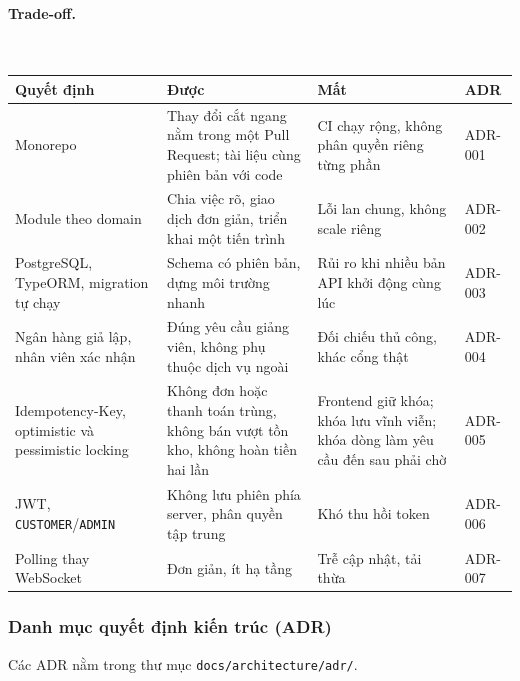 \paragraph{Trade-off.}
\mbox{}\\
{\small\renewcommand{\arraystretch}{1.25}
\begin{tabularx}{\linewidth}{@{}l X X l@{}}
\toprule
\textbf{Quyết định} & \textbf{Được} & \textbf{Mất} & \textbf{ADR} \\
\midrule
Monorepo & Thay đổi cắt ngang nằm trong một Pull Request; tài liệu cùng phiên bản với code & CI chạy rộng, không phân quyền riêng từng phần & ADR-001 \\
Module theo domain & Chia việc rõ, giao dịch đơn giản, triển khai một tiến trình & Lỗi lan chung, không scale riêng & ADR-002 \\
PostgreSQL, TypeORM, migration tự chạy & Schema có phiên bản, dựng môi trường nhanh & Rủi ro khi nhiều bản API khởi động cùng lúc & ADR-003 \\
Ngân hàng giả lập, nhân viên xác nhận & Đúng yêu cầu giảng viên, không phụ thuộc dịch vụ ngoài & Đối chiếu thủ công, khác cổng thật & ADR-004 \\
Idempotency-Key, optimistic và pessimistic locking & Không đơn hoặc thanh toán trùng, không bán vượt tồn kho, không hoàn tiền hai lần & Frontend giữ khóa; khóa lưu vĩnh viễn; khóa dòng làm yêu cầu đến sau phải chờ & ADR-005 \\
JWT, \texttt{CUSTOMER}/\texttt{ADMIN} & Không lưu phiên phía server, phân quyền tập trung & Khó thu hồi token & ADR-006 \\
Polling thay WebSocket & Đơn giản, ít hạ tầng & Trễ cập nhật, tải thừa & ADR-007 \\
\bottomrule
\end{tabularx}}

\subsubsection{Danh mục quyết định kiến trúc (ADR)}

Các ADR nằm trong thư mục \texttt{docs/architecture/adr/}.

